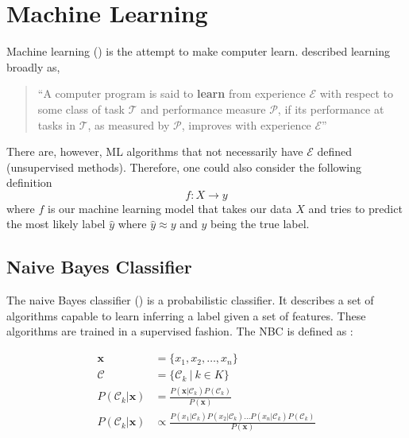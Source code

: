 \section{Machine Learning}
Machine learning () is the attempt to make computer learn. \citeauthor{Mitchell1997} described learning broadly as,
%
\begin{quote}
``A computer program is said to \textbf{learn} from experience $\mathcal{E}$ with respect to some class of task $\mathcal{T}$ and performance measure $\mathcal{P}$, if its performance at tasks in $\mathcal{T}$, as measured by $\mathcal{P}$, improves with experience $\mathcal{E}$''
\end{quote}
%
There are, however, ML algorithms that not necessarily have $\mathcal{E}$ defined (unsupervised methods). Therefore, one could also consider the following definition  \[f: X \rightarrow y\] where $f$ is our machine learning model that takes our data $X$ and tries to predict the most likely label $\hat{y}$ where $\hat{y} \approx y$ and $y$ being the true label.


\subsection{Naive Bayes Classifier}
The naive Bayes classifier () is a probabilistic classifier. It describes a set of algorithms capable to learn inferring a label given a set of features. These algorithms are trained in a supervised fashion. The NBC is defined as :

\begin{align}
  \boldsymbol{x} &= \{x_1, x_2, \dots, x_n\} \\
  \mathcal{C} &= \{\mathcal{C}_k \: | \: k \in K \} \\
  P(\mathcal{C}_k|\boldsymbol{x}) &= \frac{P(\boldsymbol{x} |\mathcal{C}_k) P(\mathcal{C}_k)} {P(\boldsymbol{x})} \\
  P(\mathcal{C}_k|\boldsymbol{x}) &\propto \frac{P(x_1 |\mathcal{C}_k)
                                       P(x_2 |\mathcal{C}_k) \dots
                                       P(x_n |\mathcal{C}_k)
                                       P(\mathcal{C}_k)}{ P(\boldsymbol{x})}
\end{align}

